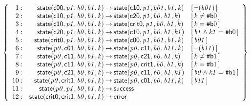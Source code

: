 \documentclass[a4paper]{article}
\newcommand{\ttsym}[1]{\mbox{\tt #1}}
\def\ttsharp{\ttsym{\symbol{35}}}
\newcommand{\symb}[1]{\mathsf{#1}}
\newcommand{\var}[1]{\mathit{#1}}
\newcommand{\Constraint}[1]{[\, #1 \,]}
\newcommand{\bv}[2][b]{{\ttsharp\symb{#1}{#2}}}
\begin{document}
\[
\left\{
\begin{array}{rr@{\>}c@{\>}ll}
\mathrm{1} : 
 & \symb{state}(\symb{c00},\var{p1},\var{b0},\var{b1},\var{k})
 & \to 
 & \symb{state}(\symb{c10},\var{p1},\var{b01},\var{b1},\var{k})
 & \Constraint{\neg(\var{b01})}\\

\mathrm{2} : 
 & \symb{state}(\symb{c10},\var{p1},\var{b0},\var{b1},\var{k})
 & \to 
 & \symb{state}(\symb{c20},\var{p1},\var{b0},\var{b1},\var{k})
 & \Constraint{\var{k} \ne \bv{0}}\\

\mathrm{3} : 
 & \symb{state}(\symb{c10},\var{p1},\var{b0},\var{b1},\var{k})
 & \to 
 & \symb{state}(\symb{crit0},\var{p1},\var{b0},\var{b1},\var{k})
 & \Constraint{\var{k} = \bv{0}}\\

\mathrm{4} : 
 & \symb{state}(\symb{c20},\var{p1},\var{b0},\var{b1},\var{k})
 & \to 
 & \symb{state}(\symb{c10},\var{p1},\var{b0},\var{b1},\var{k1})
 & \Constraint{\var{b1} \land \var{k1} = \bv{0}}\\

\mathrm{5} : 
 & \symb{state}(\symb{crit0},\var{p1},\var{b0},\var{b1},\var{k})
 & \to 
 & \symb{state}(\symb{c00},\var{p1},\var{b01},\var{b1},\var{k})
 & \Constraint{\var{b01}}\\

\mathrm{6} : 
 & \symb{state}(\var{p0},\symb{c01},\var{b0},\var{b1},\var{k})
 & \to 
 & \symb{state}(\var{p0},\symb{c11},\var{b0},\var{b11},\var{k})
 & \Constraint{\neg(\var{b11})}\\

\mathrm{7} : 
 & \symb{state}(\var{p0},\symb{c11},\var{b0},\var{b1},\var{k})
 & \to 
 & \symb{state}(\var{p0},\symb{c21},\var{b0},\var{b1},\var{k})
 & \Constraint{\var{k} \ne \bv{1}}\\

\mathrm{8} : 
 & \symb{state}(\var{p0},\symb{c11},\var{b0},\var{b1},\var{k})
 & \to 
 & \symb{state}(\var{p0},\symb{crit1},\var{b0},\var{b1},\var{k})
 & \Constraint{\var{k} = \bv{1}}\\

\mathrm{9} : 
 & \symb{state}(\var{p0},\symb{c21},\var{b0},\var{b1},\var{k})
 & \to 
 & \symb{state}(\var{p0},\symb{c11},\var{b0},\var{b1},\var{k1})
 & \Constraint{\var{b0} \land \var{k1} = \bv{1}}\\

\mathrm{10} : 
 & \symb{state}(\var{p0},\symb{crit1},\var{b0},\var{b1},\var{k})
 & \to 
 & \symb{state}(\var{p0},\symb{c01},\var{b0},\var{b11},\var{k})
 & \Constraint{\var{b11}}\\

\mathrm{11} : 
 & \symb{state}(\var{p0},\var{p1},\var{b0},\var{b1},\var{k})
 & \to 
 & \symb{success}\\

\mathrm{12} : 
 & \symb{state}(\symb{crit0},\symb{crit1},\var{b0},\var{b1},\var{k})
 & \to 
 & \symb{error}\\

\end{array}
\right\}
\]
\end{document}
